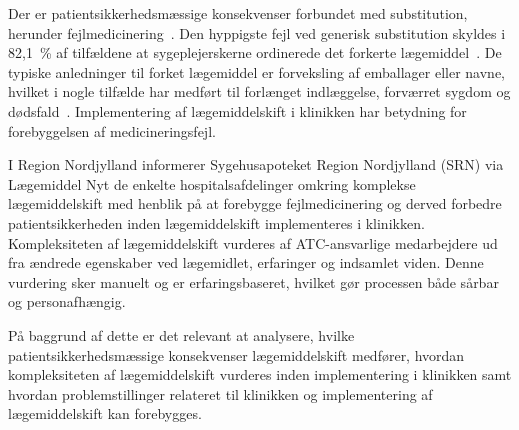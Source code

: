 Der er patientsikkerhedsmæssige konsekvenser forbundet med substitution, herunder fejlmedicinering~\citep{Hakonsen2010}. Den hyppigste fejl ved generisk substitution skyldes i 82,1~\% af tilfældene at sygeplejerskerne ordinerede det forkerte lægemiddel~\citep{Hakonsen2010}. De typiske anledninger til forket lægemiddel er forveksling af emballager eller navne, hvilket i nogle tilfælde har medført til forlænget indlæggelse, forværret sygdom og dødsfald~\citep{DanskSelskabforPatientsikkerhed2009}. Implementering af lægemiddelskift i klinikken har betydning for forebyggelsen af medicineringsfejl.

I Region Nordjylland informerer Sygehusapoteket Region Nordjylland (SRN) via Lægemiddel Nyt de enkelte hospitalsafdelinger omkring komplekse lægemiddelskift med henblik på at forebygge fejlmedicinering og derved forbedre patientsikkerheden inden lægemiddelskift implementeres i klinikken. Kompleksiteten af lægemiddelskift vurderes af ATC-ansvarlige medarbejdere ud fra ændrede egenskaber ved lægemidlet, erfaringer og indsamlet viden. Denne vurdering sker manuelt og er erfaringsbaseret, hvilket gør processen både sårbar og personafhængig.

På baggrund af dette er det relevant at analysere, hvilke patientsikkerhedsmæssige konsekvenser lægemiddelskift medfører, hvordan kompleksiteten af lægemiddelskift vurderes inden implementering i klinikken samt hvordan problemstillinger relateret til klinikken og implementering af lægemiddelskift kan forebygges. 
